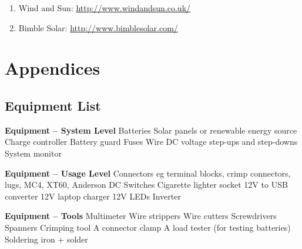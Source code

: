 \documentclass{article}
\theoremstyle{definition}
\theoremstyle{definition}
\theoremstyle{remark}
\begin{document}
    \begin{enumerate}[resume]
      \item Wind and Sun: \href{http://www.windandsun.co.uk/}{http://www.windandsun.co.uk/}
      \item Bimble Solar: \href{http://www.bimblesolar.com/}{http://www.bimblesolar.com/}
    \end{enumerate}
  


\section{Appendices} %
\label{sec:appendices}

  \subsection{Equipment List} %
  \label{sub:equipment_list}

    \textbf{Equipment – System Level} \newline
    Batteries \newline
    Solar panels or renewable energy source \newline
    Charge controller \newline
    Battery guard \newline
    Fuses \newline
    Wire \newline
    DC voltage step-ups and step-downs \newline
    System monitor

    \textbf{Equipment – Usage Level} \newline
    Connectors eg terminal blocks, crimp \newline
    connectors, lugs, MC4, XT60, Anderson \newline
    DC Switches \newline
    Cigarette lighter socket \newline
    12V to USB converter \newline
    12V laptop charger \newline
    12V LEDs \newline
    Inverter

    \textbf{Equipment – Tools} \newline
    Multimeter \newline
    Wire strippers \newline
    Wire cutters \newline
    Screwdrivers \newline
    Spanners \newline
    Crimping tool \newline
    A connector clamp \newline
    A load tester (for testing batteries) \newline
    Soldering iron + solder
      
\end{document}
